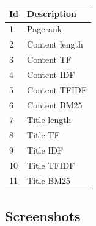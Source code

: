  
\begin{center}
\centering
\label{my-label}
\begin{tabular}{ll}
Id & Description    \\ \hline
1  & Pagerank       \\
2  & Content length \\
3  & Content TF     \\
4  & Content IDF    \\
5  & Content TFIDF  \\
6  & Content BM25   \\
7  & Title length   \\
8  & Title TF       \\
9  & Title IDF      \\
10 & Title TFIDF    \\
11 & Title BM25    
\end{tabular}
  \label{tab:setdescription} 
\end{center}




\subsection{Screenshots} \label{sec:screenshotsec}

